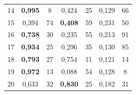 \begin{table}[htbp]
\begin{tabular}{l c c c c c c}
        14 & \textbf{0{,}995} & 8 & 0{,}424 & 25 & 0{,}129 & 66 \\
        15 & 0{,}394 & 74 & \textbf{0{,}408} & 59 & 0{,}231 & 50 \\
        16 & \textbf{0{,}738} & 30 & 0{,}235 & 55 & 0{,}213 & 91 \\
        17 & \textbf{0{,}934} & 25 & 0{,}296 & 35 & 0{,}130 & 85 \\
        18 & \textbf{0{,}793} & 27 & 0{,}754 & 11 & 0{,}121 & 14 \\
        19 & \textbf{0{,}972} & 13 & 0{,}088 & 54 & 0{,}128 & 8 \\
        20 & 0{,}633 & 32 & \textbf{0{,}830} & 25 & 0{,}182 & 31 \\
        \hline
    \end{tabular}
\end{table}

